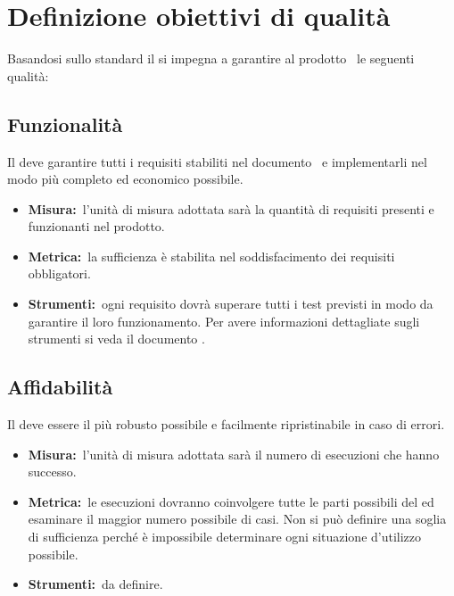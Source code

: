 
\section{Definizione obiettivi di qualità}
\label{sec:2}
	Basandosi sullo standard  il  si impegna a garantire al prodotto \PROGETTO\ le seguenti qualità:
	\subsection{Funzionalità}
		Il  deve garantire tutti i requisiti stabiliti nel documento \ARdoc\ e implementarli nel modo più completo ed economico possibile.
		\begin{itemize}
			\item \textbf{Misura:}\ l'unità di misura adottata sarà la quantità di requisiti presenti e funzionanti nel prodotto.
			\item \textbf{Metrica:}\ la sufficienza è stabilita nel soddisfacimento dei requisiti obbligatori.
			\item \textbf{Strumenti:}\ ogni requisito dovrà superare tutti i test previsti in modo da garantire il loro funzionamento. Per avere informazioni dettagliate sugli strumenti si veda il documento \NPdoc. 
		\end{itemize}
	\subsection{Affidabilità}
		Il  deve essere il più robusto possibile e facilmente ripristinabile in caso di errori.
		\begin{itemize}
			\item \textbf{Misura:}\ l'unità di misura adottata sarà il numero di esecuzioni che hanno successo.
			\item \textbf{Metrica:}\ le esecuzioni dovranno coinvolgere tutte le parti possibili del  ed esaminare il maggior numero possibile di casi. Non si può definire una soglia di sufficienza perché è impossibile determinare ogni situazione d'utilizzo possibile.
			\item \textbf{Strumenti:}\ da definire.
		\end{itemize}
